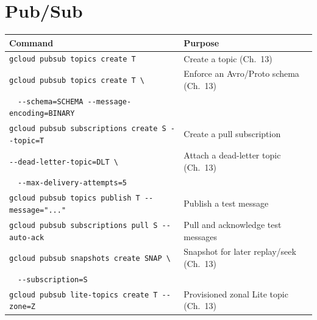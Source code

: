 \section{Pub/Sub}
\begin{center}
\footnotesize
\begin{tabular}{@{}p{6.6cm}p{6.2cm}@{}}
\toprule
\textbf{Command} & \textbf{Purpose} \\
\midrule
\texttt{gcloud pubsub topics create T} & Create a topic (Ch.~13) \\
\texttt{gcloud pubsub topics create T \textbackslash} & Enforce an Avro/Proto schema (Ch.~13) \\
~~\texttt{-{}-schema=SCHEMA -{}-message-encoding=BINARY} & \\
\texttt{gcloud pubsub subscriptions create S -{}-topic=T} & Create a pull subscription \\
\texttt{-{}-dead-letter-topic=DLT \textbackslash} & Attach a dead-letter topic (Ch.~13) \\
~~\texttt{-{}-max-delivery-attempts=5} & \\
\texttt{gcloud pubsub topics publish T -{}-message="..."} & Publish a test message \\
\texttt{gcloud pubsub subscriptions pull S -{}-auto-ack} & Pull and acknowledge test messages \\
\texttt{gcloud pubsub snapshots create SNAP \textbackslash} & Snapshot for later replay/seek (Ch.~13) \\
~~\texttt{-{}-subscription=S} & \\
\texttt{gcloud pubsub lite-topics create T -{}-zone=Z} & Provisioned zonal Lite topic (Ch.~13) \\
\bottomrule
\end{tabular}
\end{center}

